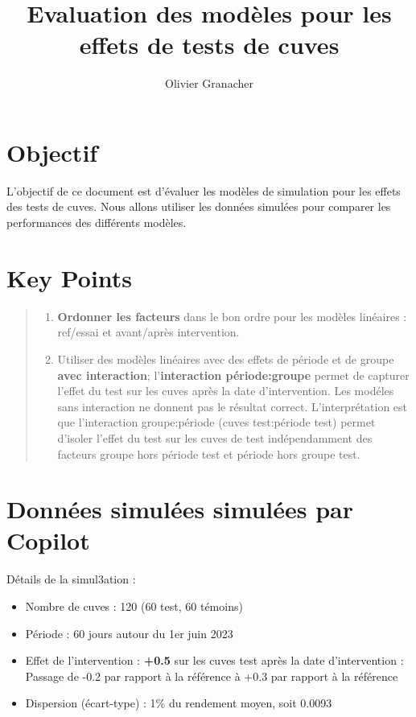 \documentclass[
  letterpaper,
  DIV=11,
  numbers=noendperiod]{scrartcl}
\title{Evaluation des modèles pour les effets de tests de cuves}
\author{Olivier Granacher}
\date{}
\providecommand{\tightlist}{%
  \setlength{\itemsep}{0pt}\setlength{\parskip}{0pt}}\usepackage{longtable,booktabs,array}
\renewcommand*\contentsname{Table of contents}
\newcommand\contentsname{Table of contents}
\begin{document}
\maketitle

\renewcommand*\contentsname{Table of contents}
{
\hypersetup{linkcolor=}
\setcounter{tocdepth}{3}
\tableofcontents
}
\section{Objectif}\label{objectif}

L'objectif de ce document est d'évaluer les modèles de simulation pour
les effets des tests de cuves. Nous allons utiliser les données simulées
pour comparer les performances des différents modèles.

\section{Key Points}\label{key-points}

\begin{quote}
\begin{enumerate}
\def\labelenumi{\arabic{enumi}.}
\tightlist
\item
  \textbf{Ordonner les facteurs} dans le bon ordre pour les modèles
  linéaires : ref/essai et avant/après intervention.
\item
  Utiliser des modèles linéaires avec des effets de période et de groupe
  \textbf{avec interaction}; l'\textbf{interaction période:groupe}
  permet de capturer l'effet du test sur les cuves après la date
  d'intervention. Les modéles sans interaction ne donnent pas le
  résultat correct. L'interprétation est que l'interaction
  groupe:période (cuves test:période test) permet d'isoler l'effet du
  test sur les cuves de test indépendamment des facteurs groupe hors
  période test et période hors groupe test.
\end{enumerate}
\end{quote}

\section{Données simulées simulées par
Copilot}\label{donnuxe9es-simuluxe9es-simuluxe9es-par-copilot}

Détails de la simul3ation :

\begin{itemize}
\item
  Nombre de cuves : 120 (60 test, 60 témoins)
\item
  Période : 60 jours autour du 1er juin 2023
\item
  Effet de l'intervention : \textbf{+0.5} sur les cuves test après la
  date d'intervention : Passage de -0.2 par rapport à la référence à
  +0.3 par rapport à la référence
\item
  Dispersion (écart-type) : 1\% du rendement moyen, soit 0.0093
\end{itemize}
\end{document}
